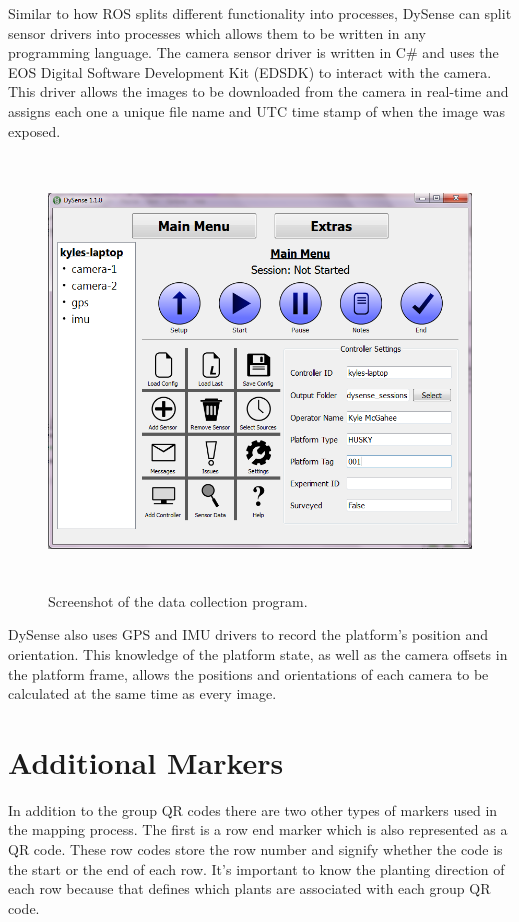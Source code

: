 Similar to how ROS splits different functionality into processes, DySense can split sensor drivers into processes which allows them to be written in any programming language.  The camera sensor driver is written in C\# and uses the EOS Digital Software Development Kit (EDSDK) to interact with the camera.  This driver allows the images to be downloaded from the camera in real-time and assigns each one a unique file name and UTC time stamp of when the image was exposed.

\begin{figure}[htb]
	\centering
    \includegraphics[height=4.5in]{figures/dysense2.png}
    \caption[Data collection program]{Screenshot of the data collection program.}
    \label{dysense_screenshot}
\end{figure}

DySense also uses GPS and IMU drivers to record the platform's position and orientation.  This knowledge of the platform state, as well as the camera offsets in the platform frame, allows the positions and orientations of each camera to be calculated at the same time as every image.    

\section{Additional Markers}
\label{system-markers}

In addition to the group QR codes there are two other types of markers used in the mapping process.  The first is a row end marker which is also represented as a QR code.  These row codes store the row number and signify whether the code is the start or the end of each row.  It's important to know the planting direction of each row because that defines which plants are associated with each group QR code.   


